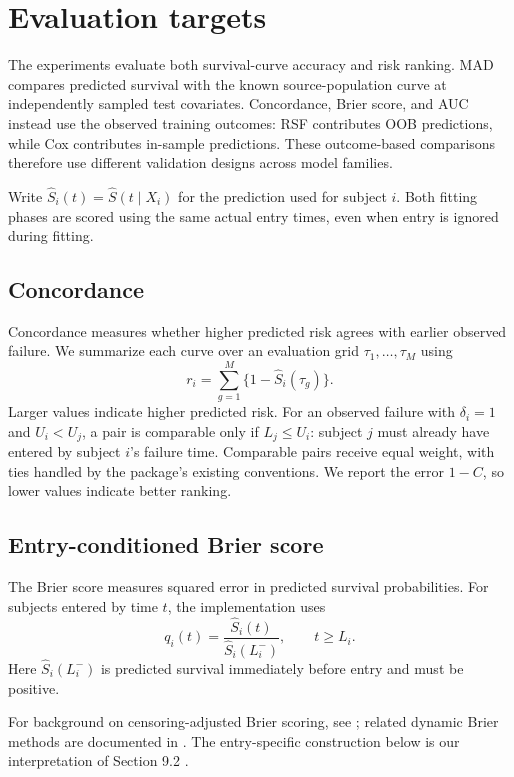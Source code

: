 \section{Evaluation targets}

The experiments evaluate both survival-curve accuracy and risk ranking.
MAD compares predicted survival with the known source-population curve
at independently sampled test covariates. Concordance, Brier score,
and AUC instead use the observed training outcomes: RSF contributes
OOB predictions, while Cox contributes in-sample predictions.
These outcome-based comparisons therefore use different validation
designs across model families.

Write $\widehat S_i(t)=\widehat S(t\mid X_i)$ for the prediction used
for subject $i$. Both fitting phases are scored using the same actual
entry times, even when entry is ignored during fitting.

\subsection{Concordance}

Concordance measures whether higher predicted risk agrees with earlier
observed failure. We summarize each curve over an evaluation grid
$\tau_1,\ldots,\tau_M$ using
\[
 r_i=\sum_{g=1}^{M}\{1-\widehat S_i(\tau_g)\}.
\]
Larger values indicate higher predicted risk. For an observed failure
with $\delta_i=1$ and $U_i<U_j$, a pair is comparable only if
$L_j\leq U_i$: subject $j$ must already have entered by subject $i$'s
failure time. Comparable pairs receive equal weight, with ties handled
by the package's existing conventions. We report the error $1-C$,
so lower values indicate better ranking.

\subsection{Entry-conditioned Brier score}

The Brier score measures squared error in predicted survival
probabilities. For subjects entered by time $t$, the implementation uses
\[
 q_i(t)=\frac{\widehat S_i(t)}{\widehat S_i(L_i^-)},
 \qquad t\geq L_i.
\]
Here $\widehat S_i(L_i^-)$ is predicted survival immediately before
entry and must be positive.

For background on censoring-adjusted Brier scoring, see
\citet[Section~4.1]{fuSimonoffSupplement}; related dynamic Brier methods
are documented in \citet{jmbayes2brier}. The entry-specific construction
below is our interpretation of Section 9.2 \citep{projectoutline}.

